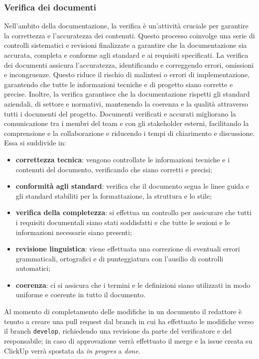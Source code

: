 \subsubsection{Verifica dei documenti} \label{verifica_dei_documenti}
Nell'ambito della documentazione, la verifica è un'attività cruciale per garantire la correttezza e l'accuratezza dei contenuti. Questo processo coinvolge una serie di controlli sistematici e revisioni finalizzate a garantire che la documentazione sia accurata, completa e conforme agli standard e ai requisiti specificati.
La verifica dei documenti assicura l'accuratezza, identificando e correggendo errori, omissioni e incongruenze. Questo riduce il rischio di malintesi o errori di implementazione, garantendo che tutte le informazioni tecniche e di progetto siano corrette e precise.
Inoltre, la verifica garantisce che la documentazione rispetti gli standard aziendali, di settore e normativi, mantenendo la coerenza e la qualità attraverso tutti i documenti del progetto. Documenti verificati e accurati migliorano la comunicazione tra i membri del team e con gli stakeholder esterni, facilitando la comprensione e la collaborazione e riducendo i tempi di chiarimento e discussione. Essa si suddivide in:
\begin{itemize}
	\item \textbf{correttezza tecnica}: vengono controllate le informazioni tecniche e i contenuti del documento, verificando che siano corretti e precisi;
	\item \textbf{conformità agli standard}: verifica che il documento segua le linee guida e gli standard stabiliti per la formattazione, la struttura e lo stile;
	\item \textbf{verifica della completezza}: si effettua un controllo per assicurare che tutti i requisiti documentali siano stati soddisfatti e che  tutte le sezioni e le informazioni necessarie siano presenti;
	\item \textbf{revisione linguistica}: viene effettuata una correzione di eventuali errori grammaticali, ortografici e di punteggiatura con l'ausilio di controlli automatici;
	\item \textbf{coerenza}: ci si assicura che i termini e le definizioni siano utilizzati in modo uniforme e coerente in tutto il documento.
\end{itemize}

Al momento di completamento delle modifiche in un documento il redattore è tenuto a creare una pull request dal branch in cui ha effettuato le modifiche verso il branch \texttt{develop}, richiedendo una revisione da parte del verificatore e del responsabile; in caso di approvazione verrà effettuato il merge e la issue creata su ClickUp verrà spostata da \textit{in progres} a \textit{done}.

